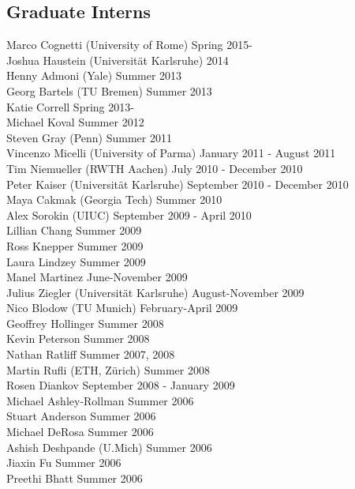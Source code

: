 \documentclass[10pt]{article}
\begin{document}
\subsection{Graduate Interns}
\noindent
Marco Cognetti (University of Rome) \hfill Spring 2015-\\
Joshua Haustein (Universit\"at Karlsruhe) \hfill 2014\\
Henny Admoni (Yale) \hfill Summer 2013\\
Georg Bartels (TU Bremen) \hfill Summer 2013\\
Katie Correll  \hfill Spring 2013-\\
Michael Koval  \hfill Summer 2012\\
Steven Gray (Penn) \hfill Summer 2011\\
Vincenzo Micelli (University of Parma) \hfill January 2011 - August 2011\\
Tim Niemueller (RWTH Aachen) \hfill July 2010 - December 2010\\ 
Peter Kaiser (Universit\"at Karlsruhe) \hfill September 2010 - December 2010\\ 
Maya Cakmak (Georgia Tech) \hfill Summer 2010\\ 
Alex Sorokin (UIUC) \hfill September 2009 - April 2010\\ 
Lillian Chang  \hfill Summer 2009\\
Ross Knepper  \hfill Summer 2009\\
Laura Lindzey  \hfill Summer 2009\\
Manel Martinez  \hfill June-November 2009\\
Julius Ziegler (Universit\"at Karlsruhe) \hfill August-November 2009\\
Nico Blodow (TU Munich) \hfill February-April 2009\\
Geoffrey Hollinger  \hfill Summer 2008\\
Kevin Peterson  \hfill Summer 2008\\
Nathan Ratliff  \hfill Summer 2007, 2008\\
Martin Rufli (ETH, Z\"urich) \hfill Summer 2008\\
Rosen Diankov  \hfill September 2008 - January 2009\\
Michael Ashley-Rollman  \hfill Summer 2006\\
Stuart Anderson  \hfill Summer 2006\\
Michael DeRosa  \hfill Summer 2006\\
Ashish Deshpande (U.Mich) \hfill Summer 2006\\
Jiaxin Fu  \hfill Summer 2006\\
Preethi Bhatt  \hfill Summer 2006\\
\end{document}
